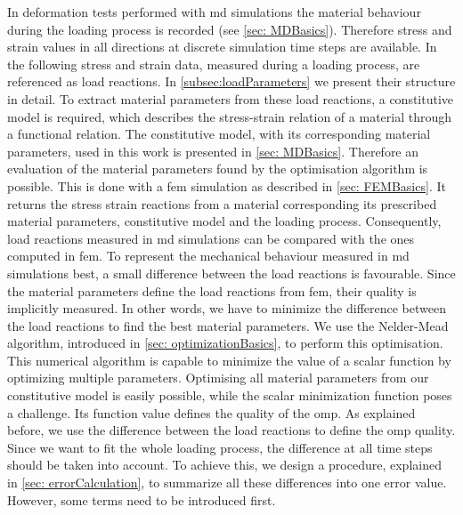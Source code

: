 In deformation tests performed with \acrshort{md} simulations the material behaviour during the loading process is recorded (see \autoref{sec: MDBasics}). Therefore stress and strain values in all directions at discrete simulation time steps are available. In the following stress and strain data, measured during a loading process, are referenced as load reactions. In \autoref{subsec:loadParameters} we present their structure in detail. To extract material parameters from these load reactions, a constitutive model is required, which describes the stress-strain relation of a material through a functional relation. The constitutive model, with its corresponding material parameters, used in this work is presented in \autoref{sec: MDBasics}. Therefore an evaluation of the material parameters found by the optimisation algorithm is possible. This is done with a \acrshort{fem} simulation as described in \autoref{sec: FEMBasics}. It returns the stress strain reactions from a material corresponding its prescribed material parameters, constitutive model and the loading process. Consequently, load reactions measured in \acrshort{md} simulations can be compared with the ones computed in \acrshort{fem}. To represent the mechanical behaviour measured in \acrshort{md} simulations best, a small difference between the load reactions is favourable. Since the material parameters define the load reactions from \acrshort{fem}, their quality is implicitly measured. In other words, we have to minimize the difference between the load reactions to find the best material parameters. We use the Nelder-Mead algorithm, introduced in \autoref{sec: optimizationBasics}, to perform this optimisation. This numerical algorithm is capable to minimize the value of a scalar function by optimizing multiple parameters. Optimising all material parameters from our constitutive model is easily possible, while the scalar minimization function poses a challenge. Its function value defines the quality of the \acrshort{omp}. As explained before, we use the difference between the load reactions to define the \acrshort{omp} quality. Since we want to fit the whole loading process, the difference at all time steps should be taken into account. To achieve this, we design a procedure, explained in \autoref{sec: errorCalculation}, to summarize all these differences into one error value. However, some terms need to be introduced first. 



